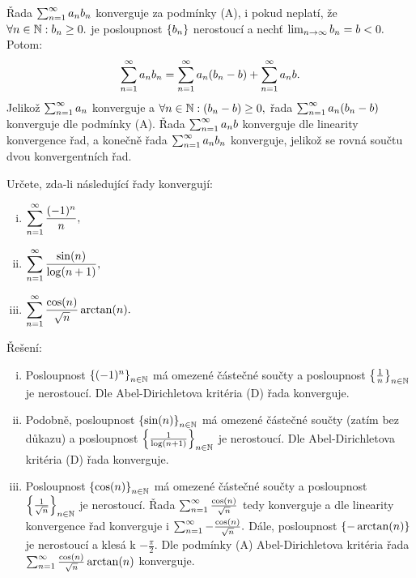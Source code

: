 \begin{remark}
    Řada $\sum_{n=1}^\infty a_nb_n$ konverguje za podmínky (A), i pokud neplatí,
    že $\forall n \in \mathbb{N}: b_n \geq 0.$ \Necht je posloupnost $\left\{b_n\right\}$
    nerostoucí a nechť $\lim_{n \to \infty} b_n = b < 0.$ Potom:
    $$\sum_{n=1}^\infty a_nb_n = \sum_{n=1}^\infty a_n(b_n-b) + \sum_{n=1}^\infty a_nb.$$
    Jelikož $\sum_{n=1}^\infty a_n$ konverguje a $\forall n \in \mathbb{N}: (b_n - b) \geq 0,$ 
    řada $\sum_{n=1}^\infty a_n(b_n-b)$ konverguje dle podmínky (A). Řada $\sum_{n=1}^\infty a_nb$
    konverguje dle linearity konvergence řad, a konečně řada $\sum_{n=1}^\infty a_nb_n$
    konverguje, jelikož se rovná součtu dvou konvergentních řad.
\end{remark}

\begin{example}
    Určete, zda-li následující řady konvergují:
    \begin{multicols}{3}
        \begin{enumerate}[(i)]
            \item $\displaystyle \sum_{n=1}^\infty \frac{(-1)^n}{n},$
            \item $\displaystyle \sum_{n=1}^\infty \frac{\sin (n)}{\log(n+1)},$
            \item $\displaystyle \sum_{n=1}^\infty \frac{\cos(n)}{\sqrt{n}}\arctan(n).$
        \end{enumerate}
    \end{multicols}

    Řešení:
    \begin{enumerate}[(i)]
        \item Posloupnost $\left\{(-1)^n\right\}_{n\in\mathbb{N}}$ má omezené částečné součty a 
            posloupnost $\left\{\frac{1}{n}\right\}_{n\in\mathbb{N}}$ je nerostoucí. Dle
            Abel-Dirichletova kritéria (D) řada konverguje.

        \item Podobně, posloupnost $\left\{\sin(n)\right\}_{n\in\mathbb{N}}$ má omezené částečné 
            součty (zatím bez důkazu) a posloupnost 
            $\left\{\frac{1}{\log(n+1)}\right\}_{n\in\mathbb{N}}$ je nerostoucí. Dle 
            Abel-Dirichletova kritéria (D) řada konverguje.

        \item Posloupnost $\left\{\cos(n)\right\}_{n\in\mathbb{N}}$ má omezené částečné 
            součty a posloupnost $\left\{\frac{1}{\sqrt{n}}\right\}_{n\in\mathbb{N}}$ je nerostoucí.
            Řada $\sum_{n=1}^\infty \frac{\cos(n)}{\sqrt{n}}$ tedy konverguje a dle linearity
            konvergence řad konverguje i $\sum_{n=1}^\infty -\frac{\cos(n)}{\sqrt{n}}.$ Dále,
            posloupnost $\left\{-\arctan(n)\right\}$ je nerostoucí a klesá k $-\frac{\pi}{2}.$
            Dle podmínky (A) Abel-Dirichletova kritéria řada
            $\sum_{n=1}^\infty \frac{\cos(n)}{\sqrt{n}}\arctan(n)$ konverguje.


    \end{enumerate}
\end{example}

